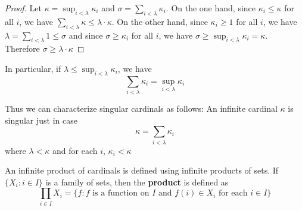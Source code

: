 \documentclass[11pt]{article}
\begin{document}
\begin{proof}
Let \(\kappa=\sup_{i<\lambda}\kappa_i\) and \(\sigma=\sum_{i<\lambda}\kappa_i\). On the
one hand, since \(\kappa_i\le\kappa\) for all \(i\), we have
\(\sum_{i<\lambda}\kappa\le\lambda\cdot\kappa\). On the other hand, since
\(\kappa_i\ge1\) for all \(i\), we have \(\lambda=\sum_{i<\lambda}1\le\sigma\) and
since \(\sigma\ge\kappa_i\) for all \(i\), we have
\(\sigma\ge\sup_{i<\lambda}\kappa_i=\kappa\). Therefore \(\sigma\ge\lambda\cdot\kappa\)
\end{proof}
In particular, if \(\lambda\le\sup_{i<\lambda}\kappa_i\), we have
\begin{equation*}
\displaystyle\sum_{i<\lambda}\kappa_i=\sup_{i<\lambda}\kappa_i
\end{equation*}

Thus we can characterize singular cardinals as follows: An infinite cardinal
\(\kappa\) is singular just in case 
\begin{equation*}
\kappa=\displaystyle\sum_{i<\lambda}\kappa_i
\end{equation*}
where \(\lambda<\kappa\) and for each \(i\), \(\kappa_i<\kappa\)

An infinite product of cardinals is defined using infinite products of sets.
If \(\{X_i:i\in I\}\) is a family of sets, then the \textbf{product} is defined as
\begin{equation*}
\displaystyle\prod_{i\in I}X_i=\{f:f\text{ is a function on }I\text{ and }
f(i)\in X_i\text{ for each }i\in I\}
\end{equation*}
\end{document}
